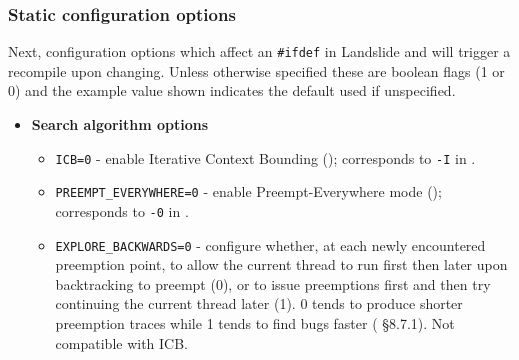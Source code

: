 \subsubsection{Static configuration options}

Next, configuration options which affect an {\tt \#ifdef} in Landslide and will trigger a recompile upon changing.
Unless otherwise specified these are boolean flags (1 or 0) and the example value shown indicates the default used if unspecified.

\begin{itemize}
\item {\bf Search algorithm options}
\begin{itemize}
	\item {\tt ICB=0} - enable Iterative Context Bounding (\sect{\ref{sec:landslide-icb}});
		corresponds to {\tt -I} in \sect{\ref{sec:landslide-quicksand-options}}.
	\item {\tt PREEMPT\_EVERYWHERE=0} - enable Preempt-Everywhere mode (\sect{\ref{sec:quicksand-eval}});
		corresponds to {\tt -0} in \sect{\ref{sec:landslide-quicksand-options}}.
	\item {\tt EXPLORE\_BACKWARDS=0} - configure whether, at each newly encountered preemption point,
		to allow the current thread to run first then later upon backtracking to preempt (0),
		or to issue preemptions first and then try continuing the current thread later (1).
		0 tends to produce shorter preemption traces while 1 tends to find bugs faster (\cite{landslide} \S{}8.7.1).
		Not compatible with ICB.
\end{itemize}


\end{itemize}
